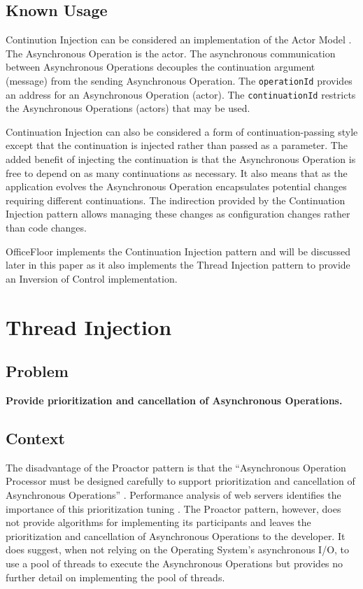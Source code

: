 \documentclass[prodmode]{style/acmlarge}
\begin{document}
\subsection{Known Usage}

Continution Injection can be considered an implementation of the Actor Model
\cite{actors}.  The Asynchronous Operation is the actor.  The asynchronous
communication between Asynchronous Operations decouples the continuation
argument (message) from the sending Asynchronous Operation.  The
\texttt{operationId} provides an address for an Asynchronous Operation
(actor).  The \texttt{continuationId} restricts the Asynchronous Operations
(actors) that may be used.

Continuation Injection can also be considered a form of continuation-passing
style \cite{continuations} except that the continuation is injected rather than
passed as a parameter.  The added benefit of injecting the continuation is that
the Asynchronous Operation is free to depend on as many continuations as
necessary.  It also means that as the application evolves the Asynchronous
Operation encapsulates potential changes requiring different continuations.  The
indirection provided by the Continuation Injection pattern allows managing these
changes as configuration changes rather than code changes.

OfficeFloor \cite{officefloor} implements the Continuation Injection pattern and
will be discussed later in this paper as it also implements the Thread Injection
pattern to provide an Inversion of Control implementation.



\section{Thread Injection}


\subsection{Problem}

\textbf{Provide prioritization and cancellation of Asynchronous Operations.}


\subsection{Context}

The disadvantage of the Proactor pattern is that the ``Asynchronous Operation
Processor must be designed carefully to support prioritization and cancellation
of Asynchronous Operations'' \cite[p. 8]{proactor}.  Performance analysis of web
servers identifies the importance of this prioritization tuning
\cite{tuning-important,low-server-footprint,tuning-os-important}. The Proactor
pattern, however, does not provide algorithms for implementing its participants
and leaves the prioritization and cancellation of Asynchronous Operations to the
developer.  It does suggest, when not relying on the Operating System's
asynchronous I/O, to use a pool of threads to execute the Asynchronous
Operations but provides no further detail on implementing the pool of threads.
\end{document}
